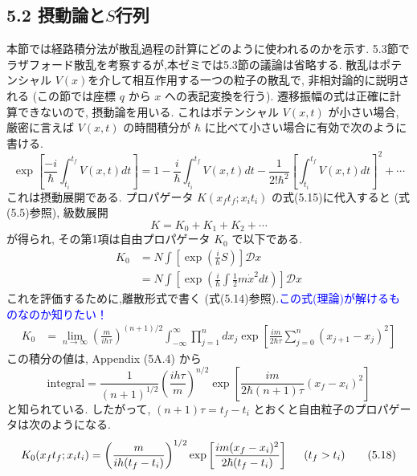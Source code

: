 \documentclass[a4paper,12pt]{article}
\begin{document}
\subsection*{\textrm{5.2 摂動論と$S$行列}}
本節では経路積分法が散乱過程の計算にどのように使われるのかを示す. 5.3節でラザフォード散乱を考察するが,本ゼミでは5.3節の議論は省略する. 散乱はポテンシャル $V(x)$を介して相互作用する一つの粒子の散乱で, 非相対論的に説明される (この節では座標 $q$ から $x$ への表記変換を行う). 遷移振幅の式は正確に計算できないので, 摂動論を用いる. これはポテンシャル $V(x, t)$ が小さい場合, 厳密に言えば $V(x, t)$ の時間積分が $\hbar$ に比べて小さい場合に有効で次のように書ける.
\begin{equation*}
    \exp\left[ \frac{-i}{\hbar} \int_{t_i}^{t_f} V(x, t)dt \right] = 1 - \frac{i}{\hbar} \int_{t_i}^{t_f} V(x, t)dt - \frac{1}{2!\hbar^2}\left[ \int_{t_i}^{t_f} V(x, t)dt \right]^2 + \cdots \tag{5.16}
\end{equation*} 
これは摂動展開である. プロパゲータ $K(x_{f}t_{f}; x_{i}t_{i})$ の式(5.15)に代入すると (式(5.5)参照), 級数展開
\begin{equation*}
    K = K_0 + K_1 + K_2 + \cdots \tag{5.17}
\end{equation*}
が得られ, その第1項は自由プロパゲータ $K_0$ で以下である.
\begin{align*}
    K_0 &= N \int \left[ \exp \left( \frac{i}{\hbar}S \right) \right]\mathcal{D}x\\
    &= N \int \left[ \exp \left( \frac{i}{\hbar}\int \frac{1}{2}m\dot{x}^2 dt \right) \right]\mathcal{D}x
\end{align*}
これを評価するために,離散形式で書く (式(5.14)参照).\textcolor{blue}{この式(理論)が解けるものなのか知りたい！}
\begin{align*}
    K_0 &= \lim_{n \rightarrow \infty} \left( \frac{m}{ih\tau} \right)^{(n+1)/2} \int_{-\infty}^{\infty} \prod_{j=1}^{n}dx_{j} \exp\left[ \frac{im}{2\hbar\tau}\sum_{j=0}^{n} (x_{j+1} - x_{j})^2 \right]
\end{align*}
この積分の値は, Appendix (5A.4) から
\begin{equation*}
    \textrm{integral} = \frac{1}{(n+1)^{1/2}}\left( \frac{ih\tau}{m} \right)^{n/2} \exp\left[ \frac{im}{2\hbar (n+1)\tau} (x_{f} - x_{i})^2 \right]
\end{equation*}
と知られている. したがって, $(n + 1)\tau = t_{f} - t_{i}$ とおくと自由粒子のプロパゲータは次のようになる.
\begin{equation*}
    K_{0}(x_{f}t_{f}; x_{i}t_{i}) = \left( \frac{m}{ih(t_{f} - t_{i})} \right)^{1/2}\exp\left[ \frac{im(x_{f} - x_{i})^2 }{2\hbar(t_{f} - t_{i})} \right]\hspace{0.5cm} (t_{f} > t_i) \tag{5.18}
\end{equation*}
\end{document}
